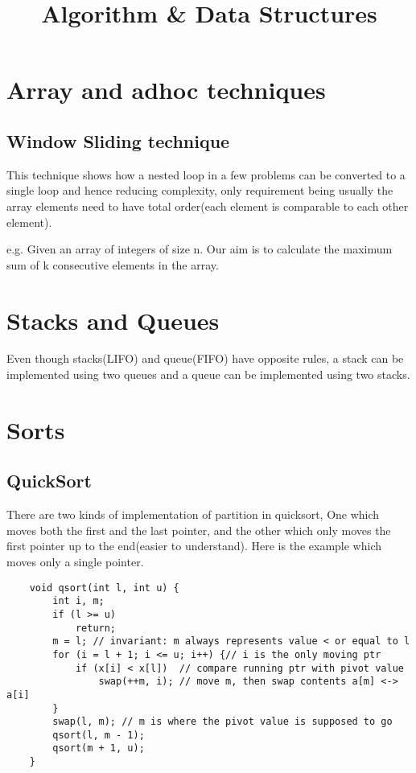 \documentclass[10pt,a4paper]{article}
\title{Algorithm \& Data Structures}
\begin{document}
	\maketitle
	
	\section{Array and adhoc techniques}
	
	\subsection{Window Sliding technique}
	
	This technique shows how a nested loop in a few problems can be converted to a single loop and hence reducing complexity, only requirement being usually the array elements need to have total order(each element is comparable to each other element).
	
	e.g. Given an array of integers of size n.
	Our aim is to calculate the maximum sum of k 
	consecutive elements in the array.
	
	
	\section{Stacks and Queues}
	Even though stacks(LIFO) and queue(FIFO) have opposite rules, a stack can be implemented using two queues and a queue can be implemented using two stacks.
	
	\section{Sorts}
	
	\subsection{QuickSort}
	There are two kinds of implementation of partition in quicksort, One which moves both the first and the last pointer, and the other which only moves the first pointer up to the end(easier to understand).
	Here is the example which moves only a single pointer.
	
	\begin{lstlisting}
	void qsort(int l, int u) {
		int i, m;
		if (l >= u)
			return;
		m = l; // invariant: m always represents value < or equal to l
		for (i = l + 1; i <= u; i++) {// i is the only moving ptr
			if (x[i] < x[l])  // compare running ptr with pivot value
				swap(++m, i); // move m, then swap contents a[m] <-> a[i]
		}
		swap(l, m); // m is where the pivot value is supposed to go
		qsort(l, m - 1);
		qsort(m + 1, u);
	}
	\end{lstlisting}
	
\end{document}
